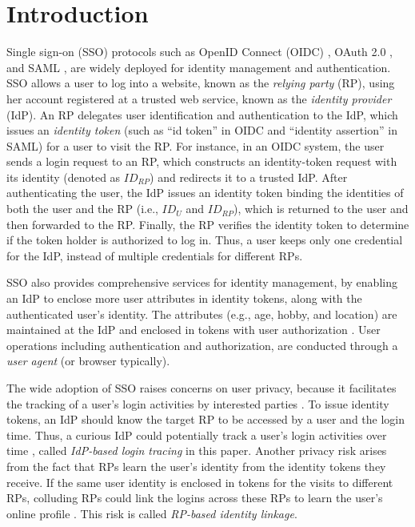 \section{Introduction}
\label{sec:intro}
Single sign-on (SSO) protocols such as OpenID Connect (OIDC) \cite{OpenIDConnect}, OAuth 2.0 \cite{rfc6749}, and SAML \cite{SAML, SAMLIdentifier}, are widely deployed for identity management and authentication.
SSO allows a user to log into a website,
 known as the \emph{relying party} (RP), using her account registered at a trusted web service, known as the \emph{identity provider} (IdP).
An RP delegates user identification and authentication to the IdP, which issues an \emph{identity token} (such as ``id token'' in OIDC and ``identity assertion'' in SAML) for a user to visit the RP.
For instance, in an OIDC system, the user sends a login request to an RP,
which constructs an identity-token request with its identity (denoted as $ID_{RP}$) and redirects it to a trusted IdP. After authenticating the user, the IdP issues an identity token binding the identities of both the user and the RP (i.e., $ID_U$ and $ID_{RP}$), which is returned to the user and then forwarded to the RP.
Finally, the RP verifies the identity token to determine if the token holder is authorized to log in. Thus, a user keeps only one credential for the IdP, instead of multiple credentials for different RPs.

SSO also provides comprehensive services for identity management,
 by enabling an IdP to enclose more user attributes in identity tokens, along with the authenticated user's identity.
The attributes (e.g., age, hobby, and location) are maintained at the IdP and enclosed in tokens with user authorization \cite{OpenIDConnect,rfc6749}.
User operations including authentication and authorization, are conducted through a \emph{user agent} (or browser typically).

The wide adoption of SSO raises concerns on user privacy, because it facilitates the tracking of a user's login activities by interested parties \cite{NIST2017draft, SPRESSO, BrowserID, maler2008venn}.
To issue identity tokens, an IdP should know the target RP to be accessed by a user and the login time.
Thus, a curious IdP could potentially track a user's login activities over time
 \cite{BrowserID, SPRESSO},
called {\em IdP-based login tracing} in this paper.
Another privacy risk arises from the fact that RPs learn the user's identity from the identity tokens they receive.
If the same user identity is enclosed in tokens for the visits to different RPs, colluding RPs could link the logins across these RPs %
to learn the user's online profile  \cite{maler2008venn, Google, FirefoxAccount}.
This risk is called {\em RP-based identity linkage}. %


